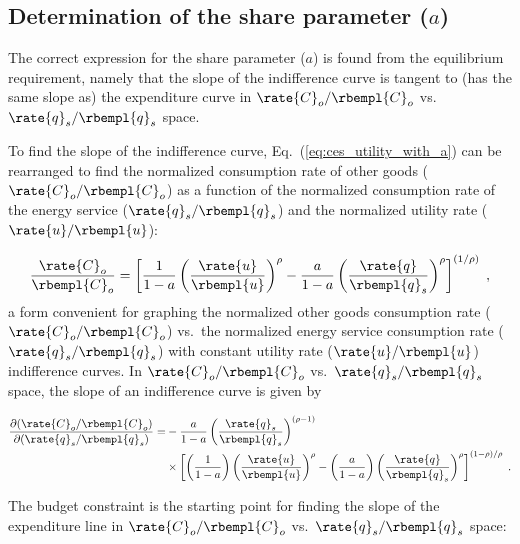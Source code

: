 \subsection{Determination of the share parameter ($a$)}
\label{sec:share_parameter_derivation}

The correct expression for the share parameter ($a$) is found from the 
equilibrium requirement,
namely that the slope of the indifference curve is tangent to 
(has the same slope as) the expenditure curve
in $\rate{C}_o/\rbempl{C}_o$ vs.\ $\rate{q}_s/\rbempl{q}_s$ space.

To find the slope of the indifference curve,
Eq.~(\ref{eq:ces_utility_with_a}) can be rearranged to find 
the normalized consumption rate of other goods ($\rate{C}_o/\rbempl{C}_o$)
as a function of the normalized consumption rate of the energy service
($\rate{q}_s/\rbempl{q}_s$)
and the normalized utility rate ($\rate{u}/\rbempl{u}$):

\begin{equation}
  \frac{\rate{C}_o}{\rbempl{C}_o} = 
      \left[ \frac{1}{1 - a} \left( \frac{\rate{u}}{\rbempl{u}} \right)^\rho 
            - \frac{a}{1 - a} \left( \frac{\rate{q}}{\rbempl{q}_s} \right)^\rho \right]^{(1/\rho)} \; ,
\end{equation}
%
a form convenient for graphing 
the normalized other goods consumption rate ($\rate{C}_o/\rbempl{C}_o$) vs.\ 
the normalized energy service consumption rate ($\rate{q}_s/\rbempl{q}_s$) 
with constant utility rate ($\rate{u}/\rbempl{u}$) indifference curves.
In $\rate{C}_o/\rbempl{C}_o$ vs.\ $\rate{q}_s/\rbempl{q}_s$ space, 
the slope of an indifference curve is given by 

\begin{align} \label{eq:slope_indifference_curve}
  \frac{\partial (\rate{C}_o/\rbempl{C}_o)}{\partial (\rate{q}_s/\rbempl{q}_s)} =&
        -\frac{a}{1 - a} \left( \frac{\rate{q}_s}{\rbempl{q}_s} \right)^{(\rho -1)} \nonumber  \\
        &\times \left[ \left( \frac{1}{1 - a} \right) \left( \frac{\rate{u}}{\rbempl{u}} \right)^\rho
                - \left( \frac{a}{1 - a} \right) 
                          \left( \frac{\rate{q}}{\rbempl{q}_s} \right)^\rho \right]^{(1 - \rho)/\rho} \; .
\end{align}

The budget constraint is the starting point for finding 
the slope of the expenditure line in 
$\rate{C}_o/\rbempl{C}_o$ vs.\ $\rate{q}_s/\rbempl{q}_s$ space:

